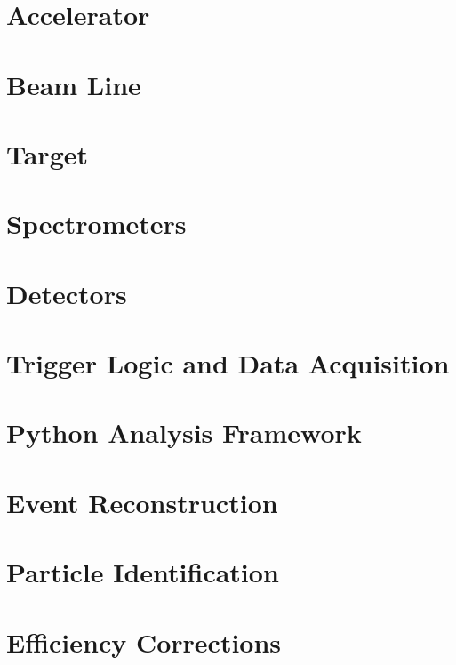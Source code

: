 \documentclass[
]{report}
\begin{document}
\hypertarget{Section-5.2}{%
\section{Accelerator}\label{Section-5.2}}

\hypertarget{Section-5.3}{%
\section{Beam Line}\label{Section-5.3}}

\hypertarget{Section-5.4}{%
\section{Target}\label{Section-5.4}}

\hypertarget{Section-5.5}{%
\section{Spectrometers}\label{Section-5.5}}

\hypertarget{Section-5.6}{%
\section{Detectors}\label{Section-5.6}}

\hypertarget{Section-5.7}{%
\section{Trigger Logic and Data Acquisition}\label{Section-5.7}}

\label{Chapter-6}

\hypertarget{Section-6.1}{%
\section{Python Analysis Framework}\label{Section-6.1}}

\hypertarget{Section-6.2}{%
\section{Event Reconstruction}\label{Section-6.2}}

\hypertarget{Section-6.3}{%
\section{Particle Identification}\label{Section-6.3}}

\hypertarget{Section-6.4}{%
\section{Efficiency Corrections}\label{Section-6.4}}
\end{document}
